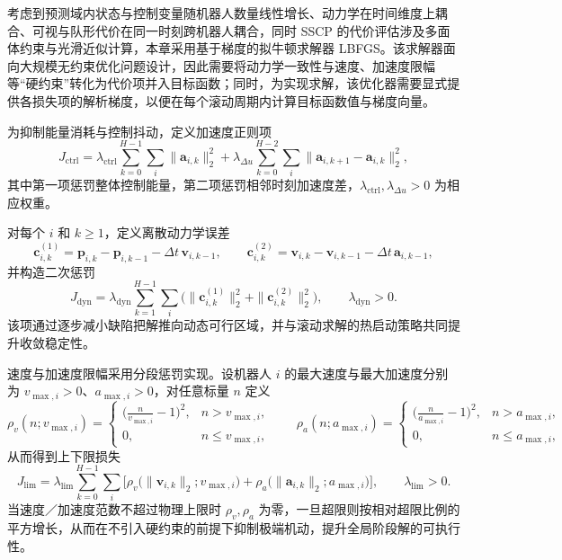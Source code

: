 考虑到预测域内状态与控制变量随机器人数量线性增长、动力学在时间维度上耦合、可视与队形代价在同一时刻跨机器人耦合，同时 SSCP 的代价评估涉及多面体约束与光滑近似计算，本章采用基于梯度的拟牛顿求解器 L\text{-}BFGS\cite{LBFGS-Lite}。该求解器面向大规模无约束优化问题设计，因此需要将动力学一致性与速度、加速度限幅等“硬约束”转化为代价项并入目标函数；同时，为实现求解，该优化器需要显式提供各损失项的解析梯度，以便在每个滚动周期内计算目标函数值与梯度向量。

为抑制能量消耗与控制抖动，定义加速度正则项
\begin{equation}
\label{eq:J_ctrl_final}
J_{\mathrm{ctrl}}
=\lambda_{\mathrm{ctrl}}\sum_{k=0}^{H-1}\sum_{i}\|\mathbf{a}_{i,k}\|_2^{2}
+\lambda_{\Delta u}\sum_{k=0}^{H-2}\sum_{i}\|\mathbf{a}_{i,k+1}-\mathbf{a}_{i,k}\|_2^{2},
\end{equation}
其中第一项惩罚整体控制能量，第二项惩罚相邻时刻加速度差，\(\lambda_{\mathrm{ctrl}},\lambda_{\Delta u}>0\) 为相应权重。

对每个 \(i\) 和 \(k\ge 1\)，定义离散动力学误差
\begin{equation}
\label{eq:dyn_defects_final}
\mathbf{c}^{(1)}_{i,k}=\mathbf{p}_{i,k}-\mathbf{p}_{i,k-1}-\Delta t\,\mathbf{v}_{i,k-1},\qquad
\mathbf{c}^{(2)}_{i,k}=\mathbf{v}_{i,k}-\mathbf{v}_{i,k-1}-\Delta t\,\mathbf{a}_{i,k-1},
\end{equation}
并构造二次惩罚
\begin{equation}
\label{eq:J_dyn_final}
J_{\mathrm{dyn}}
=\lambda_{\mathrm{dyn}}\sum_{k=1}^{H-1}\sum_{i}
\Big(\|\mathbf{c}^{(1)}_{i,k}\|_2^2+\|\mathbf{c}^{(2)}_{i,k}\|_2^2\Big),
\qquad \lambda_{\mathrm{dyn}}>0.
\end{equation}
该项通过逐步减小缺陷把解推向动态可行区域，并与滚动求解的热启动策略共同提升收敛稳定性。

速度与加速度限幅采用分段惩罚实现。设机器人 \(i\) 的最大速度与最大加速度分别为 \(v_{\max,i}>0\)、\(a_{\max,i}>0\)，对任意标量 \(n\) 定义
\begin{equation}
\label{eq:rho_funcs}
\rho_v(n;v_{\max,i})=
\begin{cases}
\big(\tfrac{n}{v_{\max,i}}-1\big)^2,& n>v_{\max,i},\\[3pt]
0,& n\le v_{\max,i},
\end{cases}
\qquad
\rho_a(n;a_{\max,i})=
\begin{cases}
\big(\tfrac{n}{a_{\max,i}}-1\big)^2,& n>a_{\max,i},\\[3pt]
0,& n\le a_{\max,i},
\end{cases}
\end{equation}
从而得到上下限损失
\begin{equation}
\label{eq:J_limit_final}
J_{\mathrm{lim}}
=\lambda_{\mathrm{lim}}\sum_{k=0}^{H-1}\sum_{i}\Big[
\rho_v\big(\|\mathbf{v}_{i,k}\|_2;v_{\max,i}\big)
+\rho_a\big(\|\mathbf{a}_{i,k}\|_2;a_{\max,i}\big)\Big],
\qquad \lambda_{\mathrm{lim}}>0.
\end{equation}
当速度／加速度范数不超过物理上限时 \(\rho_v,\rho_a\) 为零，一旦超限则按相对超限比例的平方增长，从而在不引入硬约束的前提下抑制极端机动，提升全局阶段解的可执行性。

